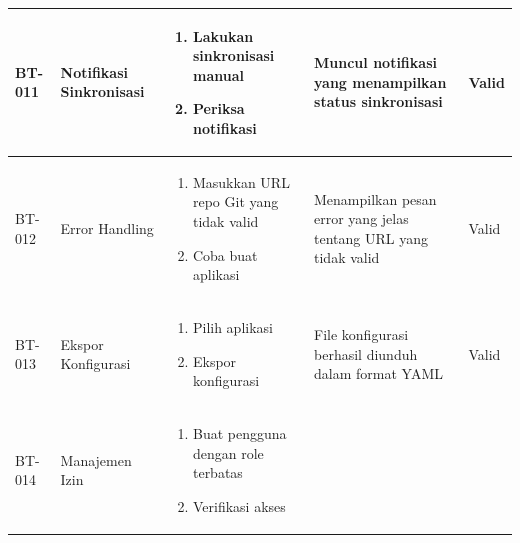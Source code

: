\begin{table}[H]
\begin{adjustbox}{width=\textwidth}
\begin{tabular}{|p{0.8cm}|p{2.2cm}|p{4cm}|p{3.5cm}|p{1.2cm}|}
      BT-011            & Notifikasi Sinkronisasi & \begin{enumerate}[leftmargin=*,noitemsep,topsep=0pt,label=\arabic*.,widest=99]
                                                      \item Lakukan sinkronisasi manual
                                                      \item Periksa notifikasi
                                                    \end{enumerate} & Muncul notifikasi yang menampilkan status sinkronisasi              & Valid                                                                          \\ \hline
      BT-012            & Error Handling          & \begin{enumerate}[leftmargin=*,noitemsep,topsep=0pt,label=\arabic*.,widest=99]
                                                      \item Masukkan URL repo Git yang tidak valid
                                                      \item Coba buat aplikasi
                                                    \end{enumerate} & Menampilkan pesan error yang jelas tentang URL yang tidak valid     & Valid                                                                          \\ \hline
      BT-013            & Ekspor Konfigurasi      & \begin{enumerate}[leftmargin=*,noitemsep,topsep=0pt,label=\arabic*.,widest=99]
                                                      \item Pilih aplikasi
                                                      \item Ekspor konfigurasi
                                                    \end{enumerate} & File konfigurasi berhasil diunduh dalam format YAML                 & Valid                                                                          \\ \hline
      BT-014            & Manajemen Izin          & \begin{enumerate}[leftmargin=*,noitemsep,topsep=0pt,label=\arabic*.,widest=99]
                                                      \item Buat pengguna dengan role terbatas
                                                      \item Verifikasi akses

\end{enumerate}
\end{tabular}
\end{adjustbox}
\end{table}
